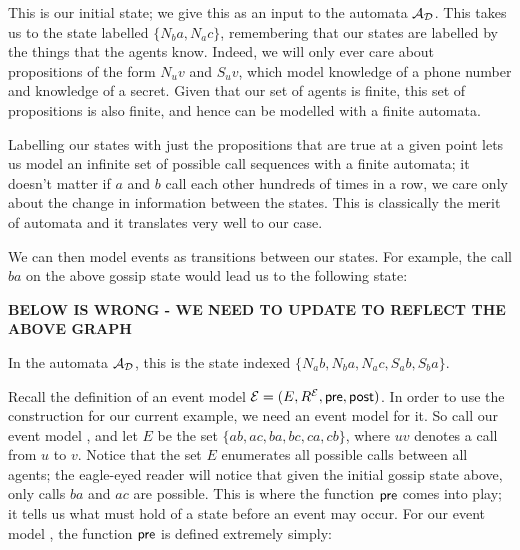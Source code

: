 \documentclass[12pt, a4paper]{article} %
\begin{document}
This is our initial state; we give this as an input to the automata $\mathcal{A_D}$. This takes us to the state labelled $\{N_b a, N_a c\}$, remembering that our states are labelled by the things that the agents know. Indeed, we will only ever care about propositions of the form $N_u v$ and $S_u v$, which model knowledge of a phone number and knowledge of a secret. Given that our set of agents is finite, this set of propositions is also finite, and hence can be modelled with a finite automata.

Labelling our states with just the propositions that are true at a given point lets us model an infinite set of possible call sequences with a finite automata; it doesn't matter if $a$ and $b$ call each other hundreds of times in a row, we care only about the change in information between the states. This is classically the merit of automata and it translates very well to our case. 

We can then model events as transitions between our states. For example, the call $ba$ on the above gossip state would lead us to the following state:

\begin{center}
\end{center}

\textbf{BELOW IS WRONG - WE NEED TO UPDATE TO REFLECT THE ABOVE GRAPH}

In the automata $\mathcal{A_D}$, this is the state indexed $\{N_a b, N_b a, N_a c, S_a b, S_b a\}$. 

Recall the definition of an event model $\mathcal{E} = (E, R^{\mathcal{E}}, \textsf{pre}, \textsf{post})$. In order to use the  construction for our current example, we need an event model for it. So call our event model , and let $E$ be the set $\{ab, ac, ba, bc, ca, cb\}$, where $uv$ denotes a call from $u$ to $v$. Notice that the set $E$ enumerates all possible calls between all agents; the eagle-eyed reader will notice that given the initial gossip state above, only calls $ba$ and $ac$ are possible. This is where the function $\textsf{pre}$ comes into play; it tells us what must hold of a state before an event may occur. For our event model , the function $\textsf{pre}$ is defined extremely simply:
\end{document}
